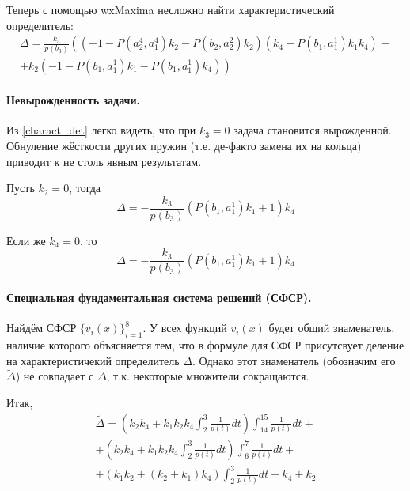\documentclass[a4paper,12pt]{article} %
\begin{document}
Теперь с помощью wxMaxima несложно найти характеристический определитель:
\begin{multline}\label{charact_det}
	\Delta =
	\frac{k_3}{p(b_3)}
	\left(
		\left( -1-P\left( a_2^4,a_1^4\right)  k_2-P\left( b_2,a_2^2\right)  k_2\right)
		\left( k_4+P\left( b_1,a_1^1\right)  k_1 k_4\right)
		\right. + \\ + \left.
		k_2 \left( -1-P\left( b_1,a_1^1\right)  k_1-P\left( b_1,a_1^1\right)  k_4\right)
	\right)
\end{multline}

\paragraph{Невырожденность задачи.}
Из \eqref{charact_det} легко видеть,
что при $k_3 = 0$ задача становится вырожденной.
Обнуление жёсткости других пружин (т.е. де-факто замена их на кольца)
приводит к не столь явным результатам.

Пусть $k_2 = 0$, тогда
\begin{equation}
	\Delta = - \frac{k_3}{p(b_3)} \left( P\left( b_1,a_1^1\right)  k_1+1\right)  k_4
\end{equation}

Если же $k_4 = 0$, то
\begin{equation}
	\Delta = - \frac{k_3}{p(b_3)} \left( P\left( b_1,a_1^1\right)  k_1+1\right)  k_4
\end{equation}


\paragraph{Специальная фундаментальная система решений (СФСР).}
Найдём СФСР $\{v_i(x)\}_{i=1}^{8}$.
У всех функций $v_i(x)$ будет общий знаменатель,
наличие которого объясняется тем,
что в формуле для СФСР присутсвует деление на характеристичекий определитель $\Delta$.
Однако этот знаменатель (обозначим его $\tilde{\Delta}$)
не совпадает с $\Delta$,
т.к. некоторые множители сокращаются.


Итак,
\begin{multline}
	\tilde{\Delta} =
	\left( k_2 k_4+k_1 k_2 k_4 \int_{2}^{3}\frac{1}{p\left( t\right) }dt\right)  \int_{14}^{15}\frac{1}{p\left( t\right) }dt+
	\\+
	\left( k_2 k_4+k_1 k_2 k_4 \int_{2}^{3}\frac{1}{p\left( t\right) }dt\right)  \int_{6}^{7}\frac{1}{p\left( t\right) }dt+
	\\+
	\left( k_1 k_2+\left( k_2+k_1\right)  k_4\right)  \int_{2}^{3}\frac{1}{p\left( t\right) }dt+k_4+k_2
\end{multline}
\end{document}
